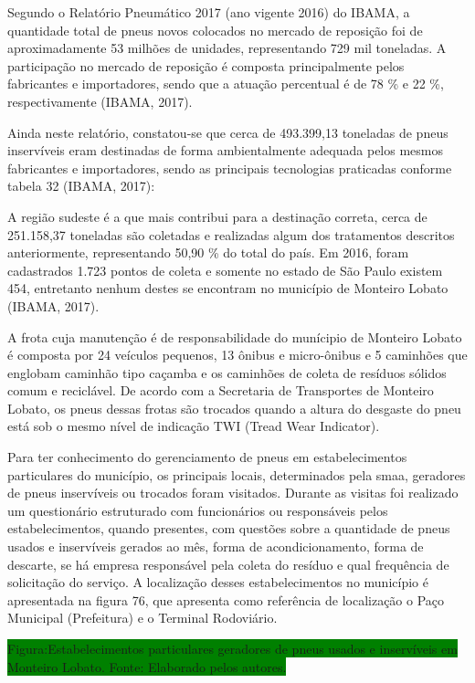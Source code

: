 \begin{description}
		Segundo o Relatório Pneumático 2017 (ano vigente 2016) do IBAMA, a quantidade total de pneus novos colocados no mercado de reposição foi de aproximadamente 53 milhões de unidades, representando 729 mil toneladas. A participação no mercado de reposição é composta principalmente pelos fabricantes e importadores, sendo que a atuação percentual é de 78 \% e 22 \%, respectivamente (IBAMA, 2017).
	
		Ainda neste relatório, constatou-se que cerca de 493.399,13 toneladas de pneus inservíveis eram destinadas de forma ambientalmente adequada pelos mesmos fabricantes e importadores, sendo as principais tecnologias praticadas conforme tabela 32 (IBAMA, 2017):	
	
		
	
		A região sudeste é a que mais contribui para a destinação correta, cerca de 251.158,37 toneladas são coletadas e realizadas algum dos tratamentos descritos anteriormente, representando 50,90 \% do total do país. Em 2016, foram cadastrados 1.723 pontos de coleta e somente no estado de São Paulo existem 454, entretanto nenhum destes se encontram no município de Monteiro Lobato (IBAMA, 2017).

		A frota cuja manutenção é de responsabilidade do munícipio de Monteiro Lobato é composta por 24 veículos pequenos, 13 ônibus e micro-ônibus e 5 caminhões que englobam caminhão tipo caçamba e os caminhões de coleta de resíduos sólidos comum e reciclável. De acordo com a Secretaria de Transportes de Monteiro Lobato, os pneus dessas frotas são trocados quando a altura do desgaste do pneu está sob o mesmo nível de indicação TWI (Tread Wear Indicator).
	
		Para ter conhecimento do gerenciamento de pneus em estabelecimentos particulares do município, os principais locais, determinados pela \gls{smaa}, geradores de pneus inservíveis ou trocados foram visitados. Durante as visitas foi realizado um questionário estruturado com funcionários ou responsáveis pelos estabelecimentos, quando presentes, com questões sobre a quantidade de pneus usados e inservíveis gerados ao mês, forma de acondicionamento, forma de descarte, se há empresa responsável pela coleta do resíduo e qual frequência de solicitação do serviço. A localização desses estabelecimentos no município é apresentada na figura 76, que apresenta como referência de localização o Paço Municipal (Prefeitura) e o Terminal Rodoviário.
	
	\colorbox{green}{Figura:Estabelecimentos particulares geradores de pneus usados e inservíveis em Monteiro Lobato. Fonte: Elaborado pelos autores.}
	

\end{description}
